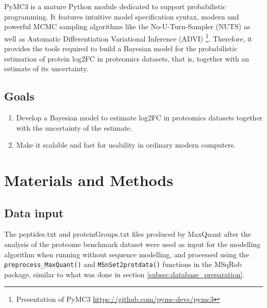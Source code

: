 
PyMC3 is a mature Python module dedicated to support probabilistic programming. It features   intuitive model specification syntax, modern and powerful \ac{MCMC} sampling algorithms like the No-U-Turn-Sampler (\ac{NUTS}) as well as Automatic Differentiation Variational Inference (ADVI) \footnote{Presentation of PyMC3 \href{https://github.com/pymc-devs/pymc3}{https://github.com/pymc-devs/pymc3}}. Therefore, it provides the tools required to build a Bayesian model for the probabilistic estimation of protein \ac{log2FC} in proteomics datasets, that is, together with an estimate of its uncertainty.


\subsection{Goals}

\begin{enumerate}

\item Develop a Bayesian model to estimate log2FC in proteomics datasets together with the uncertainty of the estimate.

\item Make it scalable and fast for usability in ordinary modern computers.

\end{enumerate}

\section{Materials and Methods}

\subsection{Data input}
\label{subsec:data_input}

The peptides.txt and proteinGroups.txt files produced by MaxQuant \cite{Cox2008} after the analysis of the proteome benchmark dataset \cite{Cox2014} were used as input for the modelling algorithm when running without sequence modelling, and processed using the \texttt{preprocess\_MaxQuant()} and \texttt{MSnSet2protdata()} functions in the MSqRob \cite{Goeminne2016} package, similar to what was done in section \ref{subsec:database_preparation}.

